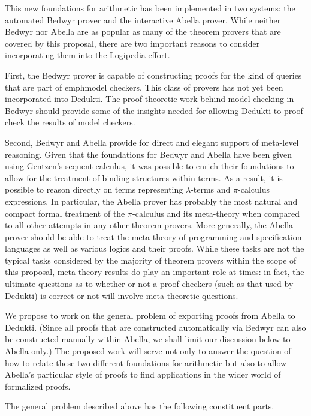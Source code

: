 This new foundations for arithmetic has been implemented in two
systems: the automated Bedwyr prover and the interactive Abella
prover.  While neither Bedwyr nor Abella are as popular as many of the
theorem provers that are covered by this proposal, there are two
important reasons to consider incorporating them into the Logipedia
effort.

First, the Bedwyr prover is capable of constructing proofs for the
kind of queries that are part of emph{model checkers}.  This class of
provers has not yet been incorporated into Dedukti.  The
proof-theoretic work behind model checking in Bedwyr should provide
some of the insights needed for allowing Dedukti to proof check the
results of model checkers.

Second, Bedwyr and Abella provide for direct and elegant support of
meta-level reasoning.  Given that the foundations for Bedwyr and
Abella have been given using Gentzen's sequent calculus, it was
possible to enrich their foundations to allow for the treatment of
binding structures within terms.  As a result, it is possible to
reason directly on terms representing $\lambda$-terms and
$\pi$-calculus expressions.  In particular, the Abella prover has
probably the most natural and compact formal treatment of the
$\pi$-calculus and its meta-theory when compared to all other attempts
in any other theorem provers.  More generally, the Abella prover
should be able to treat the meta-theory of programming and
specification languages as well as various logics and their
proofs. While these tasks are not the typical tasks considered by the
majority of theorem provers within the scope of this proposal,
meta-theory results do play an important role at times: in fact, the
ultimate questions as to whether or not a proof checkers (such as that
used by Dedukti) is correct or not will involve meta-theoretic
questions.

We propose to work on the general problem of exporting proofs from
Abella to Dedukti.  (Since all proofs that are constructed
automatically via Bedwyr can also be constructed manually within
Abella, we shall limit our discussion below to Abella only.)  The
proposed work will serve not only to answer the question of how to
relate these two different foundations for arithmetic but also to
allow Abella's particular style of proofs to find applications in the
wider world of formalized proofs.

The general problem described above has the following constituent parts.

